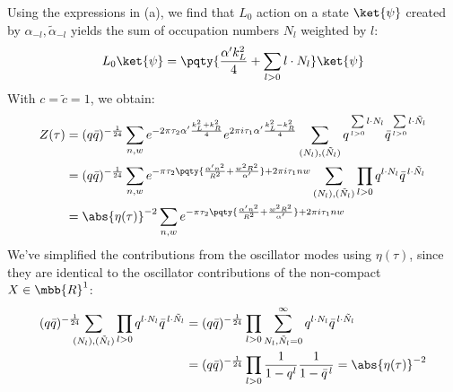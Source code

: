 \documentclass[a4paper,10pt]{article}
\begin{document}
\begin{enumerate}
\begin{enumerate}
	Using the expressions in (a), we find that $L_0$ action on a state $\ket{\psi}$ created by $\alpha_{-l},\tilde{\alpha}_{-l}$ yields the sum of occupation numbers $N_l$ weighted by $l$:
	\begin{equation}
		L_0 \ket{\psi}
		= \pqty{
				\frac{\alpha'k_L^2}{4}
				+ \sum_{l > 0} l\cdot N_l
			} \ket{\psi}
	\end{equation}
	With $c = \tilde{c} = 1$, we obtain:
	\begin{equation}
	\begin{aligned}
		Z(\tau)
		&= (q\bar{q})^{-\frac{1}{24}}
			\sum_{n,w}
				e^{
					- 2\pi \tau_2
					\alpha'\frac{k_L^2 + k_R^2}{4}
				}
				e^{
					2\pi i \tau_1
					\alpha'\frac{k_L^2 - k_R^2}{4}
				}
			\sum_{(N_l),(\tilde{N}_l)}
				q^{
					\,\sum\limits_{l>0}  l\cdot N_l
				}
				\bar{q}^{
					\,\sum\limits_{l>0}  l\cdot \tilde{N}_l
				} \\
		&= (q\bar{q})^{-\frac{1}{24}}
			\sum_{n,w}
				e^{
					- \pi \tau_2 \pqty{
						\frac{\alpha'n^2}{R^2}
						+ \frac{w^2 R^2}{\alpha'}
					}
					+ 2\pi i \tau_1 nw
				}
			\sum_{(N_l),(\tilde{N}_l)} \prod_{l>0}
				q^{l\cdot N_l}
				\bar{q}^{\,l\cdot \tilde{N}_l} \\
		&= \abs{\eta(\tau)}^{-2}
			\sum_{n,w}
				e^{
					- \pi \tau_2 \pqty{
						\frac{\alpha'n^2}{R^2}
						+ \frac{w^2 R^2}{\alpha'}
					}
					+ 2\pi i \tau_1 nw
				}
	\end{aligned}
	\end{equation}
	We've simplified the contributions from the oscillator modes using $\eta(\tau)$, since they are identical to the oscillator contributions of the non-compact $X\in\mbb{R}^1$:
	\begin{equation}
	\begin{aligned}
		(q\bar{q})^{-\frac{1}{24}}\!\!\!\!\!
		\sum_{(N_l),(\tilde{N}_l)} \prod_{l>0}
			q^{l\cdot N_l}
			\bar{q}^{\,l\cdot \tilde{N}_l}
		&= (q\bar{q})^{-\frac{1}{24}}
			\prod_{l>0} \sum_{N_l,\tilde{N}_l = 0}^\infty
				q^{l\cdot N_l}
				\bar{q}^{\,l\cdot \tilde{N}_l} \\
		&= (q\bar{q})^{-\frac{1}{24}}
			\prod_{l>0}
				\frac{1}{1 - q^l}
				\frac{1}{1 - \bar{q}^{\,l}}
		= \abs{\eta(\tau)}^{-2}
	\end{aligned}
	\end{equation}
	

\end{enumerate}
\end{enumerate}
\end{document}
